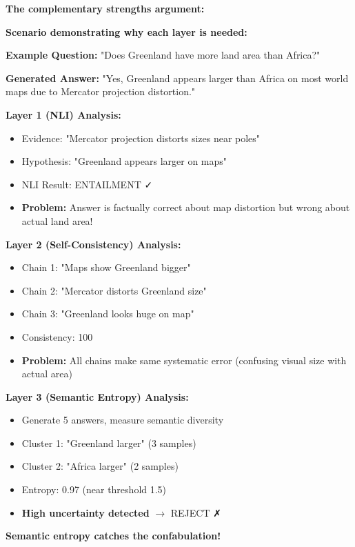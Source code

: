\documentclass[12pt,a4paper]{article}
\theoremstyle{definition}
\begin{document}
\begin{whybox}
\textbf{The complementary strengths argument:}

\textbf{Scenario demonstrating why each layer is needed:}

\textbf{Example Question:} "Does Greenland have more land area than Africa?"

\textbf{Generated Answer:} "Yes, Greenland appears larger than Africa on most world maps due to Mercator projection distortion."

\textbf{Layer 1 (NLI) Analysis:}
\begin{itemize}
    \item Evidence: "Mercator projection distorts sizes near poles"
    \item Hypothesis: "Greenland appears larger on maps"
    \item NLI Result: ENTAILMENT ✓
    \item \textbf{Problem:} Answer is factually correct about map distortion but wrong about actual land area!
\end{itemize}

\textbf{Layer 2 (Self-Consistency) Analysis:}
\begin{itemize}
    \item Chain 1: "Maps show Greenland bigger"
    \item Chain 2: "Mercator distorts Greenland size"
    \item Chain 3: "Greenland looks huge on map"
    \item Consistency: 100%
    \item \textbf{Problem:} All chains make same systematic error (confusing visual size with actual area)
\end{itemize}

\textbf{Layer 3 (Semantic Entropy) Analysis:}
\begin{itemize}
    \item Generate 5 answers, measure semantic diversity
    \item Cluster 1: "Greenland larger" (3 samples)
    \item Cluster 2: "Africa larger" (2 samples)
    \item Entropy: 0.97 (near threshold 1.5)
    \item \textbf{High uncertainty detected} $\rightarrow$ REJECT ✗
\end{itemize}

\textbf{Semantic entropy catches the confabulation!}


\end{whybox}
\end{document}
